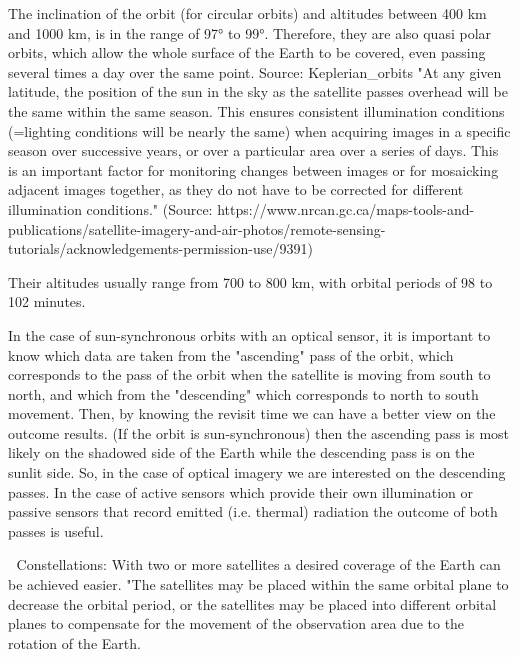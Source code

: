 The inclination of the orbit (for
circular orbits) and altitudes between 400 km and 1000 km, is
in the range of 97° to 99°. Therefore, they are also quasi polar orbits, which allow the whole surface of the Earth to be
covered, even passing several times a day over the same point.
Source: Keplerian_orbits
%
"At any given latitude, the position of the sun in the sky as the satellite passes overhead will be the same within the same season. This ensures consistent illumination conditions (=lighting conditions will be nearly
the same) when acquiring images in a specific season over successive years, or over a particular area over a series of days. This is an important factor for monitoring changes between images or for mosaicking adjacent images together, as they do not have to be corrected for different illumination conditions." (Source: https://www.nrcan.gc.ca/maps-tools-and-publications/satellite-imagery-and-air-photos/remote-sensing-tutorials/acknowledgements-permission-use/9391)

Their altitudes usually range from 700 to 800 km, with orbital periods of 98 to 102 minutes.

In the case of sun-synchronous orbits with an optical sensor, it is important to know which data are taken from the "ascending" pass of the orbit, which corresponds to the pass of the orbit when the satellite is moving from south to north, and which from the "descending" which corresponds to north to south movement. Then, by knowing the revisit time we can have a better view on the outcome results. (If the orbit is sun-synchronous) then the ascending pass is most likely on the shadowed side of the Earth while the descending pass is on the sunlit side. So, in the case of optical imagery we are interested on the descending passes. In the case of active sensors which provide their own illumination or passive sensors that record emitted (i.e. thermal) radiation the outcome of both passes is useful.



  Constellations: With two or more satellites a desired coverage of the Earth can be achieved easier. "The satellites may be placed within the same orbital plane to decrease the orbital period, or the satellites may be placed into different orbital planes to compensate for the movement of the observation area due to the rotation of the Earth.


